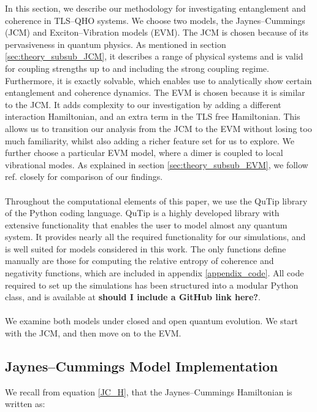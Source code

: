\documentclass[12pt]{article}
\begin{document}
In this section, we describe our methodology for investigating entanglement and coherence in TLS--QHO systems. We choose two models, the Jaynes--Cummings (JCM) and Exciton--Vibration models (EVM). The JCM is chosen because of its pervasiveness in quantum physics. As mentioned in section \ref{sec:theory_subsub_JCM}, it describes a range of physical systems and is valid for coupling strengths up to and including the strong coupling regime. Furthermore, it is exactly solvable, which enables use to analytically show certain entanglement and coherence dynamics. 
The EVM is chosen because it is similar to the JCM. It adds complexity to our investigation by adding a different interaction Hamiltonian, and an extra term in the TLS  free Hamiltonian. This allows us to transition our analysis from the JCM to the EVM without losing too much familiarity, whilst also adding a richer feature set for us to explore. We further choose a particular EVM model, where a dimer is coupled to local vibrational modes. As explained in section \ref{sec:theory_subsub_EVM}, we follow ref. \cite{ExVib2014-Alexandra} closely for comparison of our findings. \\
\\
Throughout the computational elements of this paper, we use the QuTip library of the Python coding language. QuTip is a highly developed library with extensive functionality that enables the user to model almost any quantum system. It provides nearly all the required functionality for our simulations, and is well suited for models considered in this work. The only functions define manually are those for computing the relative entropy of coherence and negativity functions, which are included in appendix \ref{appendix_code}. All code required to set up the simulations has been structured into a modular Python class, and is available at \textbf{should I include a GitHub link here?}.\\
\\
We examine both models under closed and open quantum evolution. We start with the JCM, and then move on to the EVM.

\subsection{Jaynes--Cummings Model Implementation} \label{sec:method_sub_JCM}

We recall from equation \eqref{JC_H}, that the Jaynes--Cummings Hamiltonian is written as:
\end{document}
